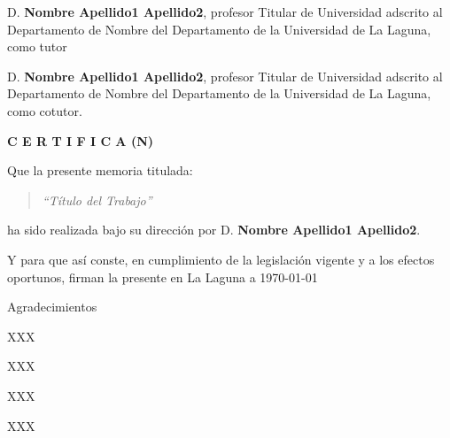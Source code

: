 \documentclass[a4paper,12pt,oneside]{scrbook}
\begin{document}
{
\setlength\parindent{0pt}
    D. \textbf{Nombre Apellido1 Apellido2}, profesor Titular de Universidad adscrito al Departamento de Nombre del Departamento de la Universidad de La Laguna, como tutor
    
    \bigskip
    D. \textbf{Nombre Apellido1 Apellido2}, profesor Titular de Universidad adscrito al Departamento de Nombre del Departamento de la Universidad de La Laguna, como cotutor.
    
    \bigskip
    \bigskip
    \textbf{C E R T I F I C A (N)}

    \bigskip
    Que la presente memoria titulada:
    
    \bigskip
    \begin{quote}
    \textit{``Título del Trabajo''}
    \end{quote}
    
    \bigskip
    \noindent ha sido realizada bajo su dirección por D. \textbf{Nombre Apellido1 Apellido2}.
    
    \bigskip
    Y para que así conste, en cumplimiento de la legislación vigente y a los efectos
    oportunos, firman la presente en La Laguna a \today
}

\thispagestyle{empty}

\begin{flushright}
    \setlength{\parindent}{0mm}

    {\LARGE Agradecimientos}
    \vspace{15mm}
    
    \begin{large}
        \begin{minipage}{0.3\textwidth}
            \begin{flushright}
            XXX
            
            XXX
            
            XXX
            
            XXX
            \end{flushright}
        \end{minipage}
    \end{large}
\end{flushright}

\thispagestyle{empty}
\end{document}
